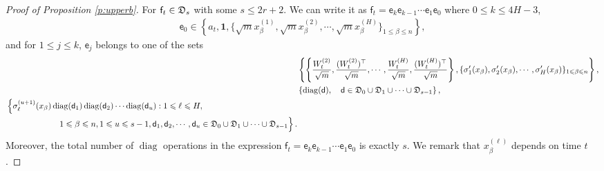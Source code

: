 \documentclass{article}
\numberwithin{equation}{section}
\newcommand{\fD}{{\frak D}}
\newcommand{\sfe}{{\mathsf e}}
\newcommand{\sfd}{{\mathsf d}}
\newcommand{\sff}{{\mathsf f}}
\newcommand{\al}{\alpha}
\DeclareMathOperator{\diag}{diag}
\renewcommand{\leq}{\leqslant}
\newcommand{\1}{\mathds{1}}
\theoremstyle{plain} %
\begin{document}
\begin{proof}[Proof of Proposition \ref{p:upperb}]
For $\sff_t\in \fD_s$ with some $s\leq 2r+2$. We can write it as $\sff_t=\sfe_k \sfe_{k-1} \cdots \sfe_1\sfe_0$ where $0\leq k\leq 4H-3$,
\begin{align*}
\sfe_0\in \left\{a_t, \bm1,\{\sqrt m x^{(1)}_\beta, \sqrt m x^{(2)}_\beta, \cdots, \sqrt m x^{(H)}_\beta\}_{1\leq \beta\leq n}\right\},
\end{align*}
and for $1\leq j\leq k$, $\sfe_j$ belongs to one of the sets
\begin{align}
\label{e:Wt}& \left\{\left\{\frac{W_t^{(2)}}{\sqrt m},\frac{(W_t^{(2)})^\top}{\sqrt m},\cdots, \frac{W_t^{(H)}}{\sqrt m},\frac{(W_t^{(H)})^\top}{\sqrt m}\right\} , \{\sigma_1'(x_\beta), \sigma_2'(x_\beta), \cdots, \sigma_H'(x_\beta)\}_{1\leq \beta\leq n}\right\},\\
\label{e:sig}&\left\{\diag(\sfd),\quad \sfd\in \fD_0\cup\fD_1\cup\cdots\cup \fD_{s-1}\right\},\\
\begin{split}
\label{e:diagd}&\left\{\sigma_\ell^{(u+1)}(x_\beta)\diag(\sfd_1)\diag(\sfd_2)\cdots \diag(\sfd_u): 1\leq \ell\leq H, \right. \\
&\left.\phantom{\sfe_j\in \left\{\sigma_\ell^{(u+1)}\right\}}1\leq \beta\leq n, 1\leq u\leq s-1, \sfd_1,\sfd_2,\cdots,\sfd_u\in \fD_0\cup \fD_1\cup\cdots\cup \fD_{s-1}\right\}.
\end{split}
\end{align}
Moreover, 
the total number of $\diag$ operations in the expression $\sff_t=\sfe_k\sfe_{k-1}\cdots \sfe_1\sfe_0$ is exactly $s$. We remark that  $x^{(\ell)}_\beta$ depends on time $t$.
%



\end{proof}
\end{document}
